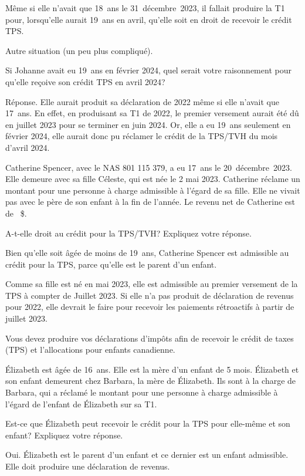 Même si elle n'avait que 18~ans le 31~décembre~2023, il fallait produire la T1 pour, lorsqu'elle aurait 19~ans en avril, qu'elle soit en droit de recevoir le crédit TPS.

Autre situation (un peu plus compliqué).

Si Johanne avait eu 19~ans en février 2024, quel serait votre raisonnement pour qu'elle reçoive son crédit TPS en avril 2024?

Réponse. Elle aurait produit sa déclaration de 2022 même si elle n'avait que 17~ans. En effet, en produisant sa T1 de 2022, le premier versement aurait été dû en juillet 2023 pour se terminer en juin 2024. Or, elle a eu 19~ans seulement en février 2024, elle aurait donc pu réclamer le crédit de la TPS/TVH du mois d'avril 2024.

\begin{question}
	Catherine Spencer, avec le NAS 801 115 379, a eu 17~ans le 20~décembre~2023. Elle demeure avec sa fille Céleste, qui est née le 2 mai 2023. Catherine réclame un montant pour une personne à charge admissible à l'égard de sa fille. Elle ne vivait pas avec le père de son enfant à la fin de l'année. Le revenu net de Catherine est de ~\$.
	
	A-t-elle droit au crédit pour la TPS/TVH? Expliquez votre réponse.
\end{question}
Bien qu'elle soit âgée de moins de 19~ans, Catherine Spencer est admissible au crédit pour la TPS, parce qu'elle est le parent d'un enfant.

Comme sa fille est né en mai 2023, elle est admissible au premier versement de la TPS à compter de Juillet 2023. Si elle n'a pas produit de déclaration de revenus pour 2022, elle devrait le faire pour recevoir les paiements rétroactifs à partir de juillet 2023.

Vous devez produire vos déclarations d'impôts afin de recevoir le crédit de taxes (TPS) et l'allocations pour enfants canadienne. 

\begin{question}
	Élizabeth est âgée de 16~ans. Elle est la mère d'un enfant de 5 mois. Élizabeth et son enfant demeurent chez Barbara, la mère de Élizabeth. Ils sont à la charge de Barbara, qui a réclamé le montant pour une personne à charge admissible à l'égard de l'enfant de Élizabeth sur sa T1.
\end{question}
\setcounter{sousQuestion}{0}
\begin{sousQuestion}
	Est-ce que Élizabeth peut recevoir le crédit pour la TPS pour elle-même et son enfant? Expliquez votre réponse.
\end{sousQuestion}
Oui. Élizabeth est le parent d'un enfant et ce dernier est un enfant admissible. Elle doit produire une déclaration de revenus.

